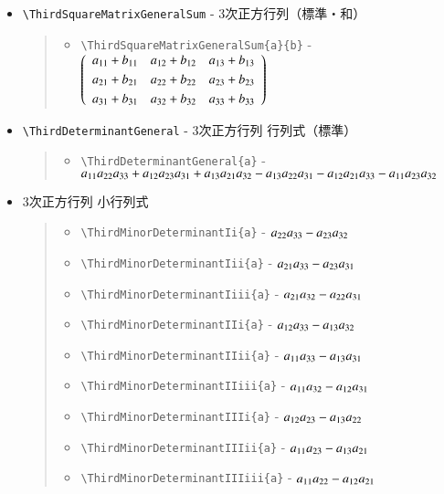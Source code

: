 \documentclass[oneside,10pt,a4paper]{jsarticle}
\begin{document}
\begin{itemize}
\begin{quote}
\begin{itemize}
          \item \verb|\ThirdSquareMatrixGeneralTransposed{a}| - $\ThirdSquareMatrixGeneralTransposed{a}$
        \end{itemize}
      \end{quote}
    \item \verb|\ThirdSquareMatrixGeneralSum| - 3次正方行列（標準・和）
      \begin{quote}
        \Example
        \begin{itemize}
          \item \verb|\ThirdSquareMatrixGeneralSum{a}{b}| - $\ThirdSquareMatrixGeneralSum{a}{b}$
        \end{itemize}
      \end{quote}
    \newpage
    \item \verb|\ThirdDeterminantGeneral| - 3次正方行列 行列式（標準）
      \begin{quote}
        \Example
        \begin{itemize}
          \item \verb|\ThirdDeterminantGeneral{a}| - \\ ${a}_{11} {a}_{22} {a}_{33} + {a}_{12} {a}_{23} {a}_{31} + {a}_{13} {a}_{21} {a}_{32} - {a}_{13} {a}_{22} {a}_{31} - {a}_{12} {a}_{21} {a}_{33} - {a}_{11} {a}_{23} {a}_{32}$
        \end{itemize}
      \end{quote}
    \item 3次正方行列 小行列式
      \begin{quote}
        \Example
        \begin{itemize}
          \item \verb|\ThirdMinorDeterminantIi{a}| - ${a}_{22} {a}_{33} - {a}_{23} {a}_{32}$
          \item \verb|\ThirdMinorDeterminantIii{a}| - ${a}_{21} {a}_{33} - {a}_{23} {a}_{31}$
          \item \verb|\ThirdMinorDeterminantIiii{a}| - ${a}_{21} {a}_{32} - {a}_{22} {a}_{31}$
          \item \verb|\ThirdMinorDeterminantIIi{a}| - ${a}_{12} {a}_{33} - {a}_{13} {a}_{32}$
          \item \verb|\ThirdMinorDeterminantIIii{a}| - ${a}_{11} {a}_{33} - {a}_{13} {a}_{31}$
          \item \verb|\ThirdMinorDeterminantIIiii{a}| - ${a}_{11} {a}_{32} - {a}_{12} {a}_{31}$
          \item \verb|\ThirdMinorDeterminantIIIi{a}| - ${a}_{12} {a}_{23} - {a}_{13} {a}_{22}$
          \item \verb|\ThirdMinorDeterminantIIIii{a}| - ${a}_{11} {a}_{23} - {a}_{13} {a}_{21}$
          \item \verb|\ThirdMinorDeterminantIIIiii{a}| - ${a}_{11} {a}_{22} - {a}_{12} {a}_{21}$
        \end{itemize}
      \end{quote}
  \end{itemize}
\end{document}
